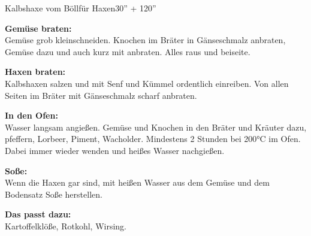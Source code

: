 \begin{MyRecipe}{Kalbshaxe vom Böll}{für  Haxen}{30'' + 120''}
	
	\textbf{Gemüse braten:}\\
	Gemüse grob kleinschneiden. Knochen im Bräter in Gänseschmalz anbraten, Gemüse dazu und auch kurz mit anbraten. Alles raus und beiseite.\par\bigskip

	\textbf{Haxen braten:}\\
	Kalbshaxen salzen und mit Senf und Kümmel ordentlich einreiben. Von allen Seiten im Bräter mit Gänseschmalz scharf anbraten.\par\bigskip

	\textbf{In den Ofen:}\\
	Wasser langsam angießen. Gemüse und Knochen in den Bräter und Kräuter dazu, pfeffern, Lorbeer, Piment, Wacholder. Mindestens 2 Stunden bei 200°C im Ofen. Dabei immer wieder wenden und
	heißes Wasser nachgießen.\par\bigskip
	
	\textbf{Soße:}\\
	Wenn die Haxen gar sind, mit heißen Wasser aus dem Gemüse und dem Bodensatz Soße herstellen.\par\bigskip

	\textbf{Das passt dazu:}\\
	Kartoffelklöße, Rotkohl, Wirsing.
		

				
	\end{MyRecipe}